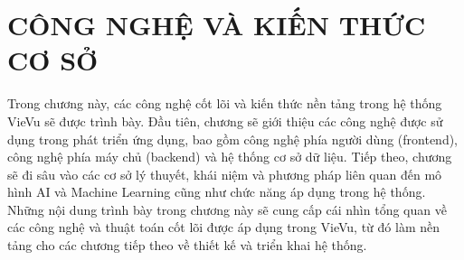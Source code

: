 \chapter{CÔNG NGHỆ VÀ KIẾN THỨC CƠ SỞ}
Trong chương này, các công nghệ cốt lõi và kiến thức nền tảng trong hệ thống VieVu sẽ được trình bày. Đầu tiên, chương sẽ giới thiệu các công nghệ được sử dụng trong phát triển ứng dụng, bao gồm công nghệ phía người dùng (frontend), công nghệ phía máy chủ (backend) và hệ thống cơ sở dữ liệu.
Tiếp theo, chương sẽ đi sâu vào các cơ sở lý thuyết, khái niệm và phương pháp liên quan đến mô hình AI và Machine Learning cũng như chức năng áp dụng trong hệ thống.
Những nội dung trình bày trong chương này sẽ cung cấp cái nhìn tổng quan về các công nghệ và thuật toán cốt lõi được áp dụng trong VieVu, từ đó làm nền tảng cho các chương tiếp theo về thiết kế và triển khai hệ thống.





